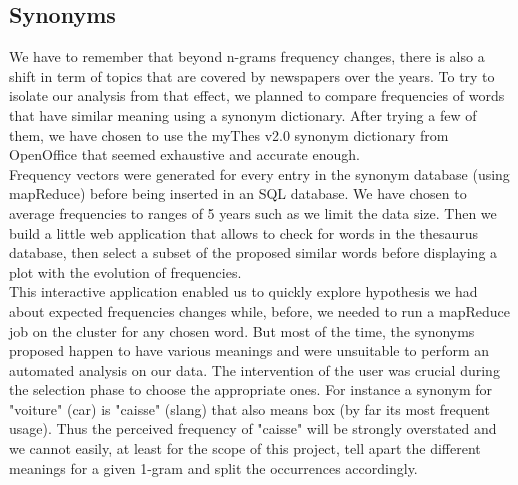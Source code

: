 \subsection{Synonyms}

We have to remember that beyond n-grams frequency changes, there is also a shift in term of topics that are covered by newspapers over the years. To try to isolate our analysis from that effect, we planned to compare frequencies of words that have similar meaning using a synonym dictionary. After trying a few of them, we have chosen to use the myThes v2.0 synonym dictionary from OpenOffice that seemed exhaustive and accurate enough. \\

Frequency vectors were generated for every entry in the synonym database (using mapReduce) before being inserted in an SQL database. We have chosen to average frequencies to ranges of 5 years such as we limit the data size. Then we build a little web application that allows to check for words in the thesaurus database, then select a subset of the proposed similar words before displaying a plot with the evolution of frequencies.\\

This interactive application enabled us to quickly explore hypothesis we had about expected frequencies changes while, before, we needed to run a mapReduce job on the cluster for any chosen word. But most of the time, the synonyms proposed happen to have various meanings and were unsuitable to perform an automated analysis on our data. The intervention of the user was crucial during the selection phase to choose the appropriate ones. For instance a synonym for "voiture" (car) is "caisse" (slang) that also means box (by far its most frequent usage). Thus the perceived frequency of "caisse" will be strongly overstated and we cannot easily, at least for the scope of this project, tell apart the different meanings for a given 1-gram and split the occurrences accordingly.

